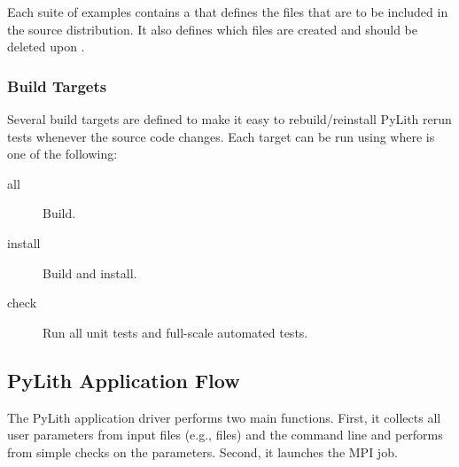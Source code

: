 Each suite of examples contains a  that defines
the files that are to be included in the source distribution. It also
defines which files are created and should be deleted upon
.

\subsubsection{Build Targets}

Several build targets are defined to make it easy to rebuild/reinstall
PyLith rerun tests whenever the source code changes. Each target can
be run using  where  is
one of the following:

\begin{description}
\item[all] Build.
\item[install] Build and install.
\item[check] Run all unit tests and full-scale automated tests.
\end{description}


\subsection{PyLith Application Flow}

The PyLith application driver performs two main functions. First, it
collects all user parameters from input files (e.g., 
files) and the command line and performs from simple checks on the
parameters. Second, it launches the MPI job.

